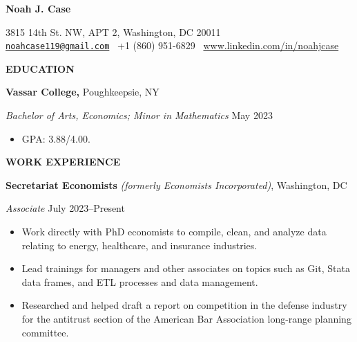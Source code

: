 \documentclass[11pt]{article}
\begin{document}
\pagestyle{empty}
\begin{center}
    \textbf{\Large Noah J. Case}\\ 

    \vspace{1pt}
    
    3815 14th St. NW, APT 2, Washington, DC 20011 \\ \href{mailto:noahcase119@gmail.com}{\texttt{noahcase119@gmail.com}} \textbullet \ +1 (860) 951-6829 \textbullet \ \url{www.linkedin.com/in/noahjcase}
\end{center}

\vspace{-20pt}
\hrulefill
\vspace{-6pt}

\begin{center}
    \textbf{EDUCATION} \\
\end{center}
\textbf{Vassar College,} \hfill Poughkeepsie, NY

\textit{Bachelor of Arts, Economics; Minor in Mathematics} \hfill May 2023
\begin{itemize}[noitemsep, topsep=0pt, partopsep=0pt, parsep=0pt]
    \item GPA: 3.88/4.00.
\end{itemize}

\begin{center}
    \textbf{WORK EXPERIENCE}
\end{center}

\textbf{Secretariat Economists} \textit{(formerly Economists Incorporated)}, \hfill Washington, DC

\textit{Associate} \hfill July 2023--Present
\begin{itemize}[noitemsep, topsep=0pt, partopsep=0pt, parsep=0pt]
    \item Work directly with PhD economists to compile, clean, and analyze data relating to energy, healthcare, and insurance industries.
    \item Lead trainings for managers and other associates on topics such as Git, Stata data frames, and ETL processes and data management.
    \item Researched and helped draft a report on competition in the defense industry for the antitrust section of the American Bar Association long-range planning committee.
\end{itemize}

\vspace{12pt}
\end{document}
